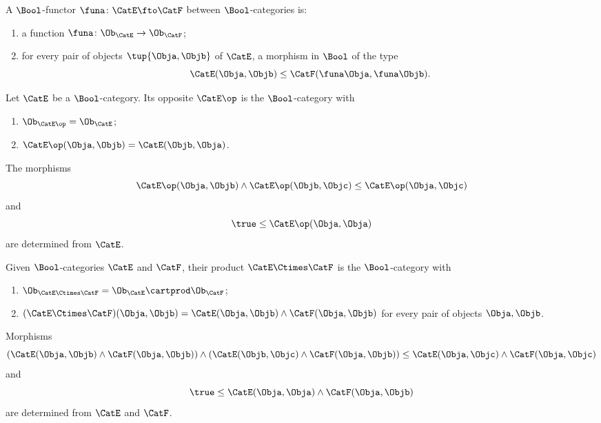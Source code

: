 \begin{ctdefinition}
A $\Bool$-functor $\funa \colon \CatE \fto \CatF$ between $\Bool$-categories is:

\constit
\begin{enumerate}
\item a function $\funa \colon \Ob_\CatE \to \Ob_\CatF$;
\item for every pair of objects $\tup{\Obja, \Objb}$ of $\CatE$, a morphism in $\Bool$ of the type
\begin{equation}
\CatE(\Obja, \Objb) \leq \CatF(\funa \Obja, \funa \Objb). 
\end{equation}
\end{enumerate}
\end{ctdefinition}


\begin{ctdefinition}
Let $\CatE$ be a $\Bool$-category. Its opposite $\CatE\op$ is the $\Bool$-category with 
\begin{enumerate}
\item $\Ob_{\CatE\op} = \Ob_\CatE$;
\item $\CatE\op(\Obja, \Objb) = \CatE(\Objb, \Obja)$.
\end{enumerate}

The morphisms 
\begin{equation}
\CatE\op(\Obja, \Objb) \wedge \CatE\op(\Objb, \Objc) \leq \CatE\op(\Obja, \Objc)
\end{equation}
and
\begin{equation}
\true \leq \CatE\op(\Obja, \Obja)
\end{equation}
are determined from $\CatE$.
\end{ctdefinition}

\begin{ctdefinition}
Given $\Bool$-categories $\CatE$ and $\CatF$, their product $\CatE \Ctimes \CatF$ is the $\Bool$-category with 
\begin{enumerate}
\item $\Ob_{\CatE \Ctimes \CatF} = \Ob_\CatE \cartprod \Ob_\CatF$;
\item $(\CatE \Ctimes \CatF)(\Obja, \Objb) = \CatE (\Obja, \Objb) \wedge \CatF (\Obja, \Objb)$ for every pair of objects $\Obja, \Objb$. 
\end{enumerate}
Morphisms 
\begin{equation}
(\CatE(\Obja, \Objb) \wedge \CatF(\Obja, \Objb)) \wedge (\CatE(\Objb, \Objc) \wedge \CatF(\Obja, \Objb)) \leq \CatE(\Obja, \Objc) \wedge  \CatF(\Obja, \Objc)
\end{equation}
and
\begin{equation}
\true \leq \CatE(\Obja, \Obja) \wedge \CatF(\Obja, \Objb)
\end{equation}
are determined from $\CatE$ and $\CatF$.
\end{ctdefinition}


